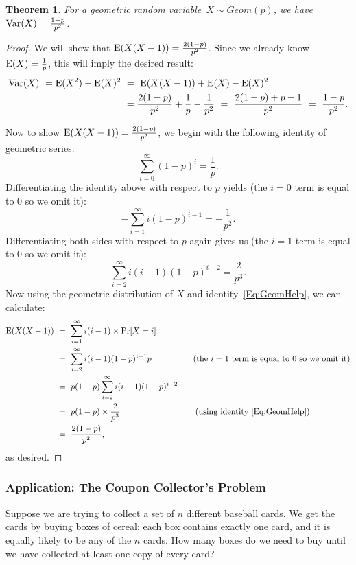\documentclass[11pt]{article}
\def\Ex#1{{\rm E}(#1)}
\def\Var#1{{\rm Var}(#1)}
\newcounter{thm}
\newtheorem{theorem}{Theorem}[thm]
\begin{document}
\begin{theorem}
For a geometric random variable~$X \sim Geom(p)$, we have $\Var{X} = \frac{1-p}{p^2}$.
\end{theorem}
\begin{proof}
We will show that $\Ex{X(X-1)} = \frac{2(1-p)}{p^2}$. Since we already know $\Ex{X} = \frac{1}{p}$, this will imply the desired result:
\begin{align*}
\Var{X} ~= \Ex{X^2} - \Ex{X}^2  
            ~&=~ \Ex{X(X-1)} + \Ex{X} - \Ex{X}^2 \\
            &= \frac{2(1-p)}{p^2} + \frac{1}{p} - \frac{1}{p^2}
            ~=~ \frac{2(1-p) + p - 1}{p^2}
            ~=~ \frac{1-p}{p^2}.
\end{align*}

Now to show $\Ex{X(X-1)} = \frac{2(1-p)}{p^2}$, we begin with the following identity of geometric series:
$$\sum_{i=0}^\infty (1-p)^i = \frac{1}{p}.$$
Differentiating the identity above with respect to $p$ yields (the $i = 0$ term is equal to $0$ so we omit it):
$$-\sum_{i=1}^\infty i (1-p)^{i-1} = -\frac{1}{p^2}.$$
Differentiating both sides with respect to $p$ again gives us (the $i = 1$ term is equal to $0$ so we omit it):
\begin{equation}\label{Eq:GeomHelp}
\sum_{i=2}^\infty i(i-1) (1-p)^{i-2} = \frac{2}{p^3}.
\end{equation}
Now using the geometric distribution of $X$ and identity~\eqref{Eq:GeomHelp}, we can calculate:
\begin{align*}
\Ex{X(X-1)} ~&=~ \sum_{i=1}^\infty i(i-1) \times \Pr[X = i]  \\
   ~&=~ \sum_{i=2}^\infty i(i-1) (1-p)^{i-1} p ~~~~~~~~~~~~~~~ \text{(the $i = 1$ term is equal to $0$ so we omit it)} \\
   ~&=~ p(1-p) \sum_{i=2}^\infty i(i-1) (1-p)^{i-2} \\
   ~&=~ p(1-p) \times \frac{2}{p^3} ~~~~~~~~~~~~~~~~~~~~~~~~~~~ \text{(using identity~\eqref{Eq:GeomHelp})} \\
   ~&=~ \frac{2(1-p)}{p^2},
\end{align*}
as desired.
\end{proof}



\subsubsection*{Application: The Coupon Collector's Problem}

Suppose we are trying to collect a set of $n$ different baseball cards.  We get the cards by
buying boxes of cereal: each box contains exactly one card, and it is
equally likely to be any of the $n$ cards.  How many boxes do we need
to buy until we have collected at least one copy of every card?
\end{document}
